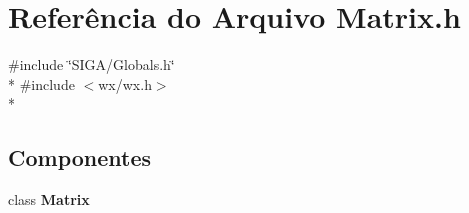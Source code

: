 \section{Referência do Arquivo Matrix.\+h}
\label{_matrix_8h}
{\ttfamily \#include \char`\"{}S\+I\+G\+A/\+Globals.\+h\char`\"{}}\\*
{\ttfamily \#include $<$wx/wx.\+h$>$}\\*
\subsection*{Componentes}
\begin{DoxyCompactItemize}
\item 
class {\bf Matrix}
\end{DoxyCompactItemize}
